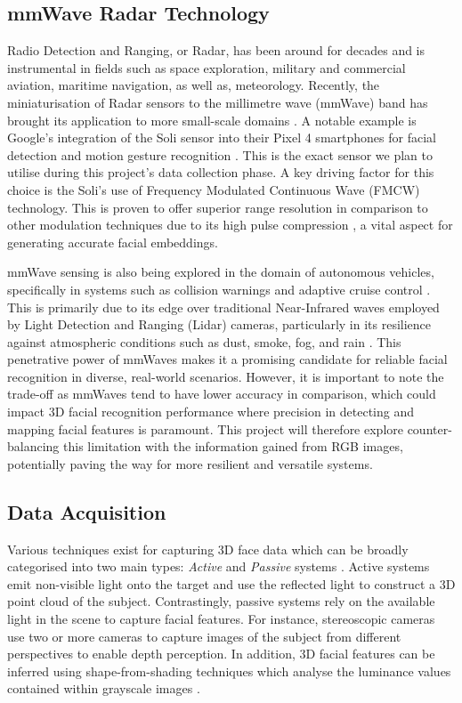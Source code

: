 \documentclass{interim}
\begin{document}
\subsection{mmWave Radar Technology}
Radio Detection and Ranging, or Radar, has been around for decades and is instrumental in fields such as space exploration, military and commercial aviation, maritime navigation, as well as, meteorology. Recently, the miniaturisation of Radar sensors to the millimetre wave (mmWave) band has brought its application to more small-scale domains \cite{soumya2023recent}. A notable example is Google's integration of the Soli sensor into their Pixel 4 smartphones for facial detection and motion gesture recognition \cite{googleblog2020}. This is the exact sensor we plan to utilise during this project's data collection phase. A key driving factor for this choice is the Soli's use of Frequency Modulated Continuous Wave (FMCW) technology. This is proven to offer superior range resolution in comparison to other modulation techniques due to its high pulse compression \cite{mahafza2005radar}, a vital aspect for generating accurate facial embeddings. 

mmWave sensing is also being explored in the domain of autonomous vehicles, specifically in systems such as collision warnings and adaptive cruise control \cite{dfrobot}. This is primarily due to its edge over traditional Near-Infrared waves employed by Light Detection and Ranging (Lidar) cameras, particularly in its resilience against atmospheric conditions such as dust, smoke, fog, and rain \cite{cadenceblog2022}. This penetrative power of mmWaves makes it a promising candidate for reliable facial recognition in diverse, real-world scenarios. However, it is important to note the trade-off as mmWaves tend to have lower accuracy in comparison, which could impact 3D facial recognition performance where precision in detecting and mapping facial features is paramount. This project will therefore explore counter-balancing this limitation with the information gained from RGB images, potentially paving the way for more resilient and versatile systems.


\subsection{Data Acquisition}
\label{background:data_acquisition}
Various techniques exist for capturing 3D face data which can be broadly categorised into two main types: \textit{Active} and \textit{Passive} systems \cite{zhou20183d}. Active systems emit non-visible light onto the target and use the reflected light to construct a 3D point cloud of the subject. Contrastingly, passive systems rely on the available light in the scene to capture facial features. For instance, stereoscopic cameras use two or more cameras to capture images of the subject from different perspectives to enable depth perception. In addition, 3D facial features can be inferred using shape-from-shading techniques which analyse the luminance values contained within grayscale images \cite{horn1977understanding}.
\end{document}
